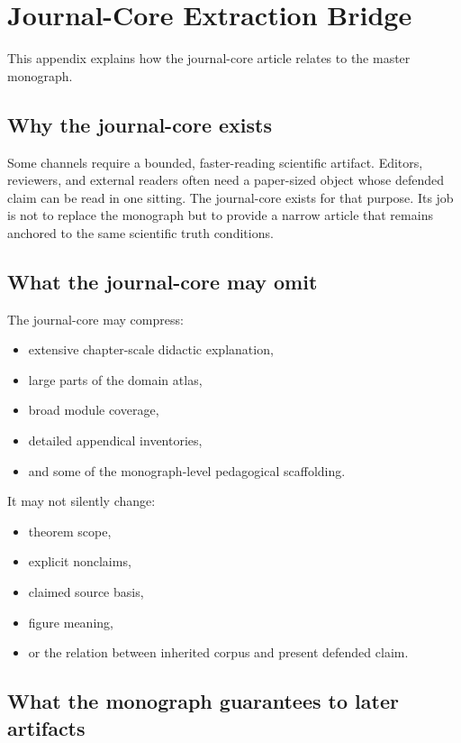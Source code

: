 \section{Journal-Core Extraction Bridge}

This appendix explains how the journal-core article relates to the master monograph.

\subsection{Why the journal-core exists}

Some channels require a bounded, faster-reading scientific artifact.
Editors, reviewers, and external readers often need a paper-sized object whose defended claim can
be read in one sitting.
The journal-core exists for that purpose.
Its job is not to replace the monograph but to provide a narrow article that remains anchored to
the same scientific truth conditions.

\subsection{What the journal-core may omit}

The journal-core may compress:

\begin{itemize}
\item extensive chapter-scale didactic explanation,
\item large parts of the domain atlas,
\item broad module coverage,
\item detailed appendical inventories,
\item and some of the monograph-level pedagogical scaffolding.
\end{itemize}

It may not silently change:

\begin{itemize}
\item theorem scope,
\item explicit nonclaims,
\item claimed source basis,
\item figure meaning,
\item or the relation between inherited corpus and present defended claim.
\end{itemize}

\subsection{What the monograph guarantees to later artifacts}


